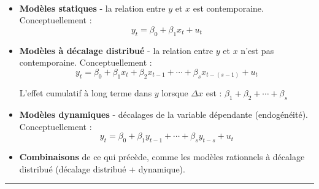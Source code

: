 	\begin{f}{\ }
		

	\begin{itemize}[leftmargin=*]
		\item \textbf{Modèles statiques} - la relation entre $y$ et $x$ est contemporaine. Conceptuellement :
\[y_{t} = \beta_{0} + \beta_{1} x_{t} + u_{t}\]
		
		\item \textbf{Modèles à décalage distribué} - la relation entre $y$ et $x$ n'est pas contemporaine. Conceptuellement :
\[y_{t} = \beta_{0} + \beta_{1} x_{t} + \beta_{2} x_{t - 1} + \cdots + \beta_{s} x_{t - (s - 1)} + u_{t}\]
		
		L'effet cumulatif à long terme dans $y$ lorsque $\Delta x$ est :
			$\beta_{1} + \beta_{2} + \cdots + \beta_{s}$
		
		\item \textbf{Modèles dynamiques} - décalages de la variable dépendante (endogénéité). Conceptuellement :
\[y_{t} = \beta_{0} + \beta_{1} y_{t - 1} + \cdots + \beta_{s} y_{t - s} + u_{t}\]
		
		\item \textbf{Combinaisons} de ce qui précède, comme les modèles rationnels à décalage distribué (décalage distribué + dynamique).
	\end{itemize}	

\end{f} 
 \hrule 
 
